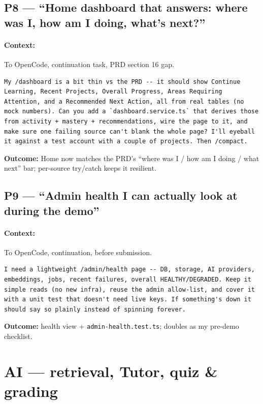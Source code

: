 \documentclass[11pt,a4paper]{article}
\begin{document}
\subsection{P8 --- ``Home dashboard that answers: where was I, how am I doing, what's next?''}
\paragraph{Context:} To OpenCode, continuation task, PRD section 16 gap.
\begin{lstlisting}
My /dashboard is a bit thin vs the PRD -- it should show Continue Learning, Recent Projects, Overall Progress, Areas Requiring Attention, and a Recommended Next Action, all from real tables (no mock numbers). Can you add a `dashboard.service.ts` that derives those from activity + mastery + recommendations, wire the page to it, and make sure one failing source can't blank the whole page? I'll eyeball it against a test account with a couple of projects. Then /compact.
\end{lstlisting}
\textbf{Outcome:} Home now matches the PRD's ``where was I / how am I doing / what next'' bar; per-source try/catch keeps it resilient.

\subsection{P9 --- ``Admin health I can actually look at during the demo''}
\paragraph{Context:} To OpenCode, continuation, before submission.
\begin{lstlisting}
I need a lightweight /admin/health page -- DB, storage, AI providers, embeddings, jobs, recent failures, overall HEALTHY/DEGRADED. Keep it simple reads (no new infra), reuse the admin allow-list, and cover it with a unit test that doesn't need live keys. If something's down it should say so plainly instead of spinning forever.
\end{lstlisting}
\textbf{Outcome:} health view + \texttt{admin-health.test.ts}; doubles as my pre-demo checklist.

\section{AI --- retrieval, Tutor, quiz \& grading}
\end{document}
